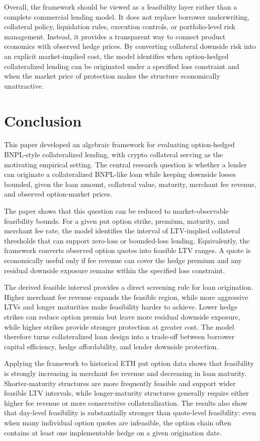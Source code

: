 \documentclass[11pt]{article}
\begin{document}
Overall, the framework should be viewed as a feasibility layer rather than a complete commercial lending model. It does not replace borrower underwriting, collateral policy, liquidation rules, execution controls, or portfolio-level risk management. Instead, it provides a transparent way to connect product economics with observed hedge prices. By converting collateral downside risk into an explicit market-implied cost, the model identifies when option-hedged collateralized lending can be originated under a specified loss constraint and when the market price of protection makes the structure economically unattractive.


\section{Conclusion}

This paper developed an algebraic framework for evaluating option-hedged BNPL-style collateralized lending, with crypto collateral serving as the motivating empirical setting. The central research question is whether a lender can originate a collateralized BNPL-like loan while keeping downside losses bounded, given the loan amount, collateral value, maturity, merchant fee revenue, and observed option-market prices.

The paper shows that this question can be reduced to market-observable feasibility bounds. For a given put option strike, premium, maturity, and merchant fee rate, the model identifies the interval of LTV-implied collateral thresholds that can support zero-loss or bounded-loss lending. Equivalently, the framework converts observed option quotes into feasible LTV ranges. A quote is economically useful only if fee revenue can cover the hedge premium and any residual downside exposure remains within the specified loss constraint.

The derived feasible interval provides a direct screening rule for loan origination. Higher merchant fee revenue expands the feasible region, while more aggressive LTVs and longer maturities make feasibility harder to achieve. Lower hedge strikes can reduce option premia but leave more residual downside exposure, while higher strikes provide stronger protection at greater cost. The model therefore turns collateralized loan design into a trade-off between borrower capital efficiency, hedge affordability, and lender downside protection.

Applying the framework to historical ETH put option data shows that feasibility is strongly increasing in merchant fee revenue and decreasing in loan maturity. Shorter-maturity structures are more frequently feasible and support wider feasible LTV intervals, while longer-maturity structures generally require either higher fee revenue or more conservative collateralization. The results also show that day-level feasibility is substantially stronger than quote-level feasibility: even when many individual option quotes are infeasible, the option chain often contains at least one implementable hedge on a given origination date.
\end{document}
